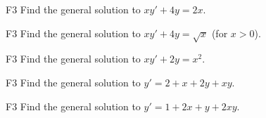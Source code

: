 \begin{problem}{F3}
Find the general solution to \(xy' + 4y = 2x\).
\end{problem}

\begin{problem}{F3}
Find the general solution to \(xy' + 4y = \sqrt{x}\) (for \(x>0\)).
\end{problem}

\begin{problem}{F3}
Find the general solution to \(xy' + 2y = x^2\).
\end{problem}

\begin{problem}{F3}
Find the general solution to \(y' = 2 + x + 2y + xy\).
\end{problem}

\begin{problem}{F3}
Find the general solution to \(y' = 1 + 2x + y + 2xy\).
\end{problem}

